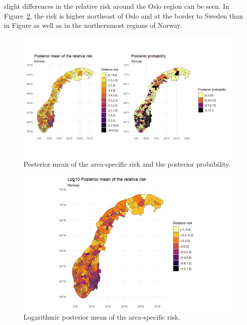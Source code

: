 slight differences in the relative risk around the Oslo region can be seen. In Figure~\ref{posteriorNorwayAllLog}, the risk is higher northeast of Oslo and at the border to Sweden than in Figure%
as well as in the northernmost regions of Norway.
\begin{figure}[H]
    \centering
    \includegraphics[width = \textwidth]{posterior_norway_all.png}
    \caption{Posterior mean of the area-specific risk and the posterior probability.}
    \label{posteriorNorwayAll}
\end{figure}
%     
\begin{figure}[H]
    \centering
    \includegraphics[width = \textwidth]{posterior_norway_all_log.png}
    \caption{Logarithmic posterior mean of the area-specific risk.}
    \label{posteriorNorwayAllLog}
\end{figure}
%     
